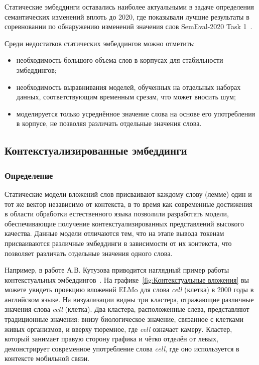 \documentclass[LI,VKR]{HSEUniversity}
\begin{document}
Статические эмбеддинги оставались наиболее актуальными в задаче определения семантических изменений вплоть до 2020,
где показывали лучшие результаты в соревновании по обнаружению изменений значения слов SemEval-2020 Task 1~\cite{semeval2020task}.

Среди недостатков статических эмбеддингов можно отметить:
\begin{itemize}
    \item необходимость большого объема слов в корпусах для стабильности эмбеддингов;
    \item необходимость выравнивания моделей, обученных на отдельных наборах данных,
соответствующим временным срезам, что может вносить шум;
    \item моделируется только усреднённое значение слова на основе его употребления в корпусе,
не позволяя различать отдельные значения слова.
\end{itemize}

\subsection{Контекстуализированные эмбеддинги}

\subsubsection*{Определение}

Статические модели вложений слов присваивают каждому слову (лемме) один и тот же вектор
независимо от контекста, в то время как современные достижения в области обработки
естественного языка позволили разработать модели,
обеспечивающие получение контекстуализированных представлений высокого качества.
Данные модели отличаются тем, что на этапе вывода токенам присваиваются различные эмбеддинги
в зависимости от их контекста, что позволяет различать отдельные значения одного слова.

Например, в работе А.В. Кутузова приводится наглядный пример работы
контекстуальных эмбеддингов~\cite{Kutuzov2020Thesis}.
На графике~\ref{fig:Контекстуальные вложения} вы можете увидеть проекцию вложений ELMo для слова \textit{cell} (клетка)
в 2000 годы в английском языке.
На визуализации видны три кластера, отражающие различные значения слова \textit{cell} (клетка).
Два кластера, расположенные слева, представляют традиционные значения:
внизу биологическое значение, связанное с клетками живых организмов,
и вверху тюремное, где \textit{cell} означает камеру.
Кластер, который занимает правую сторону графика и чётко отделён от левых,
демонстрирует современное употребление слова \textit{cell},
где оно используется в контексте мобильной связи.
\end{document}
